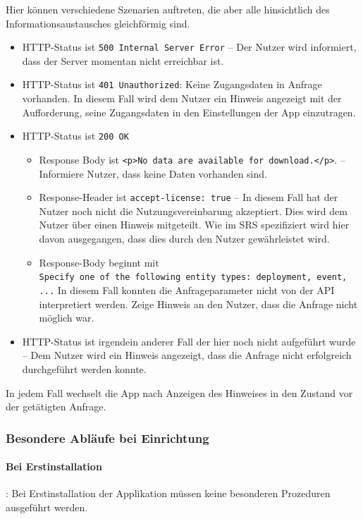 \documentclass[12pt]{article} %
\begin{document}
Hier können verschiedene Szenarien
auftreten, die aber alle hinsichtlich des Informationsaustausches gleichförmig sind.
\begin{itemize} 
 	 \item HTTP-Status ist \lstinline$500 Internal Server Error$ -- Der Nutzer wird informiert, dass der Server momentan nicht erreichbar ist.
 	 \item HTTP-Status ist \lstinline$401 Unauthorized$: Keine Zugangsdaten in Anfrage vorhanden. In diesem Fall wird dem Nutzer ein Hinweis angezeigt mit der Aufforderung, seine Zugangsdaten in den Einstellungen der App einzutragen. 
 	 \item HTTP-Status ist \lstinline$200 OK$
 	 \begin{itemize} 
 	   	 \item Response Body ist \lstinline$<p>No data are available for download.</p>$. -- Informiere Nutzer, dass keine Daten vorhanden sind.
 	   	 \item Response-Header ist \lstinline$accept-license: true$ -- In diesem Fall hat der Nutzer noch nicht die Nutzungsvereinbarung akzeptiert. Dies wird dem Nutzer über einen Hinweis mitgeteilt. Wie im SRS spezifiziert wird hier davon ausgegangen, dass dies durch den Nutzer gewährleistet wird.
 	   	 \item Response-Body beginnt mit \\ \lstinline$Specify one of the following entity types: deployment, event, ...$ In diesem Fall konnten die Anfrageparameter nicht von der API interpretiert werden. Zeige Hinweis an den Nutzer, dass die Anfrage nicht möglich war. 
 	  \end{itemize}  
 	  \item HTTP-Status ist irgendein anderer Fall der hier noch nicht aufgeführt wurde -- Dem Nutzer wird ein Hinweis angezeigt, dass die Anfrage nicht erfolgreich durchgeführt werden konnte.
\end{itemize} 

In jedem Fall wechselt die App nach Anzeigen des Hinweises in den Zustand vor der getätigten Anfrage.


\subsubsection{Besondere Abläufe bei Einrichtung}

\paragraph{Bei Erstinstallation}: Bei Erstinstallation der Applikation
müssen keine besonderen Prozeduren ausgeführt werden. 
\end{document}
